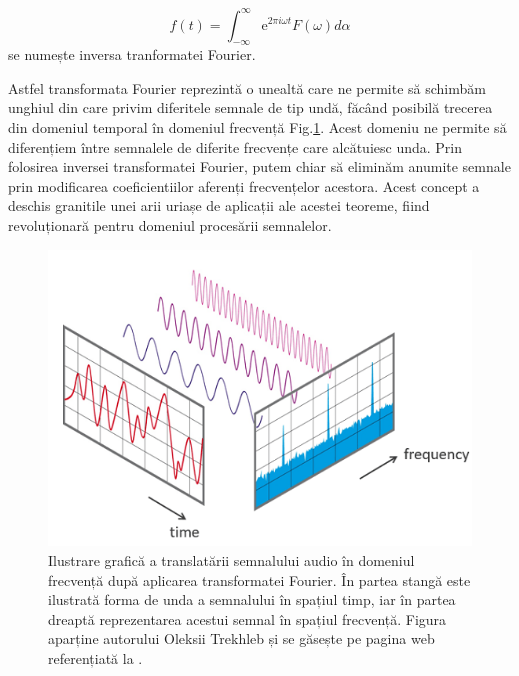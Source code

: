 \documentclass[a4paper,12pt]{book}
\begin{document}
			\begin{equation*}
				f(t) = \int_{-\infty}^{\infty}  \mathrm{e}^{2\pi i\omega t} F(\omega) d\alpha
			\end{equation*}
			se numește inversa tranformatei Fourier. \par
			Astfel transformata Fourier reprezintă o unealtă care ne permite să schimbăm unghiul din care privim diferitele semnale de tip undă, făcând posibilă trecerea din domeniul temporal în domeniul frecvență Fig.\ref{fig:tf}. Acest domeniu ne permite să diferențiem între semnalele de diferite frecvențe care alcătuiesc unda. Prin folosirea inversei transformatei Fourier, putem chiar să eliminăm anumite semnale prin modificarea coeficientiilor aferenți frecvențelor acestora. Acest concept a deschis granitile unei arii uriașe de aplicații ale acestei teoreme, fiind revoluționară pentru domeniul procesării semnalelor.  	
				\begin{figure}[h]
					\centering
					\includegraphics[scale=0.50]{ft}
					\caption{Ilustrare grafică a translatării semnalului audio în domeniul frecvență după aplicarea transformatei Fourier.  În partea stangă este ilustrată forma de unda a semnalului în spațiul timp, iar în partea dreaptă reprezentarea acestui semnal în spațiul frecvență. Figura aparține autorului Oleksii Trekhleb și se găsește pe pagina web referențiată la \cite{stft6}.}
					\label{fig:tf}
				\end{figure}		
				
\end{document}
